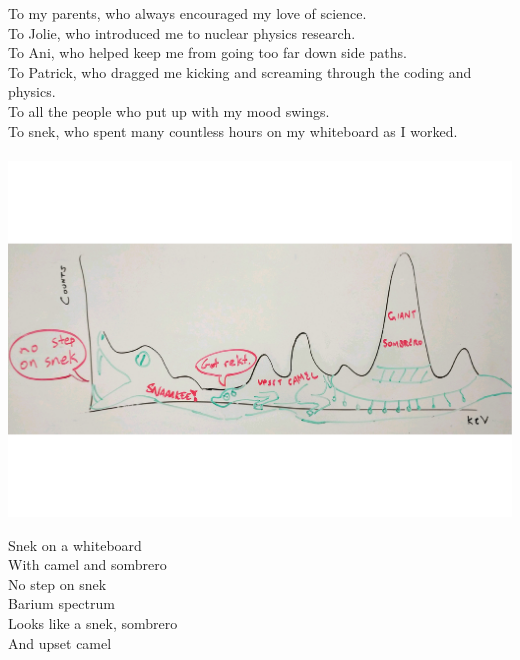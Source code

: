 \documentclass[final,numrefs,sort&compress,noinfo]{nddiss2e}
\begin{document}
\renewcommand{\dedicationname}{
\hspace{0pt}
\vfill
To my parents, who always encouraged my love of science.\\
To Jolie, who introduced me to nuclear physics research.\\
To Ani, who helped keep me from going too far down side paths. \\
To Patrick, who dragged me kicking and screaming through the coding and physics. \\
To all the people who put up with my mood swings.\\
To snek, who spent many countless hours on my whiteboard as I worked.\\
\\
\includegraphics[scale=0.4]{snek.pdf}\\
\begin{multicols}{2}
    Snek on a whiteboard\\
    With camel and sombrero\\
    No step on snek \\
    \columnbreak
    Barium spectrum\\
    Looks like a snek, sombrero\\
    And upset camel
\end{multicols}
\vfill
\hspace{0pt}}

{\centering\dedicationname}




\tableofcontents
\listoffigures
\listoftables
\end{document}
